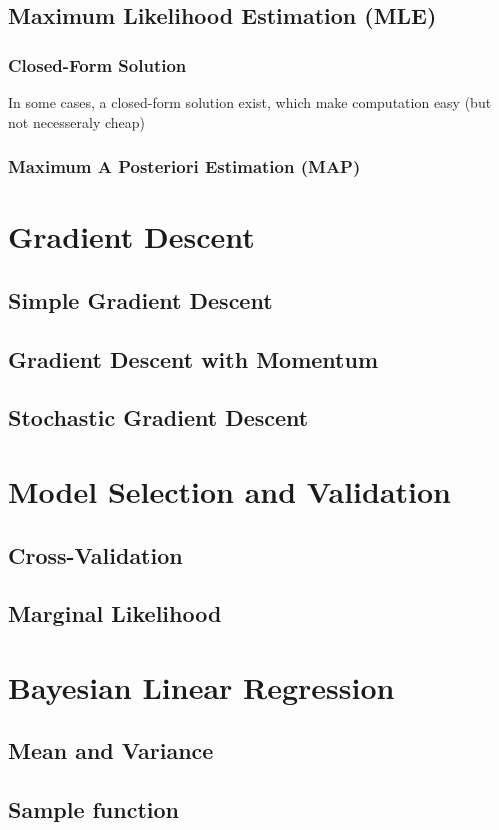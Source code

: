 	\subsection{Maximum Likelihood Estimation (MLE)}

		\subsubsection*{Closed-Form Solution}

			In some cases, a closed-form solution exist, which make computation easy (but not necesseraly cheap)
	\subsubsection{Maximum A Posteriori Estimation (MAP)}

\section{Gradient Descent}

	\subsection{Simple Gradient Descent}

	\subsection{Gradient Descent with Momentum}

	\subsection{Stochastic Gradient Descent}


\section{Model Selection and Validation}

	\subsection{Cross-Validation}

	\subsection{Marginal Likelihood}

\section{Bayesian Linear Regression}

	\subsection{Mean and Variance}

	\subsection{Sample function}


